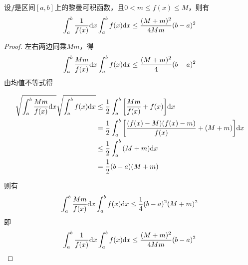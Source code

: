 \begin{theorem}
    
    设$f$是区间$[a, b]$上的黎曼可积函数，且$0 < m \leq f(x) \leq M$，则有
    $$\int_{a}^{b}{\dfrac{1}{f(x)}}\mathrm{d} x \int_{a}^{b}{f(x)}\mathrm{d} x \leq \dfrac{(M + m)^2}{4Mm}(b - a)^2 $$

\end{theorem}

\begin{proof}
    
    左右两边同乘$Mm$，得
    $$\int_{a}^{b}{\dfrac{Mm}{f(x)}}\mathrm{d} x \int_{a}^{b}{f(x)}\mathrm{d} x \leq \dfrac{(M + m)^2}{4}(b - a)^2$$
    由均值不等式得

    \begin{align*}
        \sqrt{\int_{a}^{b}{\dfrac{Mm}{f(x)}}\mathrm{d} x} \sqrt{\int_{a}^{b}{f(x)}\mathrm{d} x} & \leq \dfrac{1}{2} \int_{a}^{b}{\left[ \dfrac{Mm}{f(x)} + f(x) \right]}\mathrm{d} x \\
        & = \dfrac{1}{2} \int_{a}^{b}{\left[ \dfrac{(f(x) - M)(f(x) - m)}{f(x)} + (M + m) \right]}\mathrm{d} x \\
        & \leq \dfrac{1}{2} \int_{a}^{b}{(M + m)}\mathrm{d} x \\
        & = \dfrac{1}{2}(b - a)(M + m)
    \end{align*}

    则有
    $$\int_{a}^{b}{\dfrac{Mm}{f(x)}}\mathrm{d} x \int_{a}^{b}{f(x)}\mathrm{d} x \leq\dfrac{1}{4} (b - a)^2(M + m)^2$$
    即
    $$ \int_{a}^{b}{\dfrac{1}{f(x)}}\mathrm{d} x \int_{a}^{b}{f(x)}\mathrm{d} x \leq \dfrac{(M + m)^2}{4Mm}(b - a)^2 $$

\end{proof}